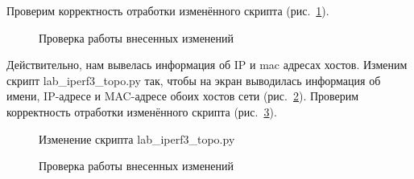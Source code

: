\documentclass[
  english,
  russian,
  12pt,
  a4paper,
  DIV=11,
  numbers=noendperiod]{scrreprt}
\begin{document}
Проверим корректность отработки изменённого скрипта
(рис.~\ref{fig-004}).

\begin{figure}


\caption{\label{fig-004}Проверка работы внесенных изменений}

\end{figure}%

Действительно, нам вывелась информация об IP и mac адресах хостов.
Изменим скрипт lab\_iperf3\_topo.py так, чтобы на экран выводилась
информация об имени, IP-адресе и MAC-адресе обоих хостов сети
(рис.~\ref{fig-005}). Проверим корректность отработки изменённого
скрипта (рис.~\ref{fig-006}).

\begin{figure}


\caption{\label{fig-005}Изменение скрипта lab\_iperf3\_topo.py}

\end{figure}%

\begin{figure}


\caption{\label{fig-006}Проверка работы внесенных изменений}

\end{figure}%
\end{document}
